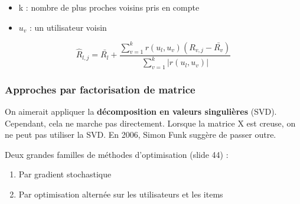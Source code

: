 \documentclass{article}
\begin{document}
\begin{itemize}
\item k : nombre de plus proches voisins pris en compte
\item $u_v$ : un utilisateur voisin
\end{itemize}

$$ \hat{R}_{l, j} = \bar{R_l} + \frac{\sum_{v=1}^k r(u_l, u_v) (R_{v,j} - \bar{R_v})}{\sum_{v=1}^k | r(u_l, u_v) |} $$

\subsubsection{Approches par factorisation de matrice}

On aimerait appliquer la \textbf{décomposition en valeurs singulières} (SVD). Cependant, cela ne marche pas directement. Lorsque la matrice X est creuse, on ne peut pas utiliser la SVD. En 2006, Simon Funk suggère de passer outre.

Deux grandes familles de méthodes d'optimisation (slide 44) : 
\begin{enumerate}
\item Par gradient stochastique
\item Par optimisation alternée sur les utilisateurs et les items
\end{enumerate}
\end{document}
